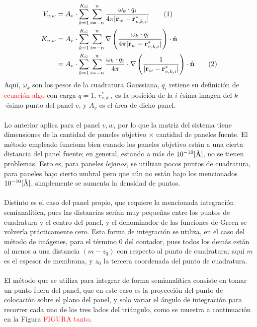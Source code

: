 \documentclass[12pt, oneside, numbers, spanish]{ezthesis}
\newcommand\numberthis{\addtocounter{equation}{1}\tag{\theequation}}
\numberwithin{equation}{section}
\newcommand{\angstrom}{\text{\normalfont\AA}}
\begin{document}
\begin{align*}
V_{v,w} &= A_v\cdot\sum_{k=1}^{K_G}\sum_{i=-n}^{n}\frac{\omega_k\cdot q_i}{4\pi|\mathbf{r}_w - \mathbf{r}_{v,k,i}^*|} \numberthis\\
K_{v,w} &= A_v\cdot\sum_{k=1}^{K_G}\sum_{i=-n}^{n}\nabla\left(\frac{\omega_k\cdot q_i}{4\pi|\mathbf{r}_w - \mathbf{r}_{v,k,i}^*|}\right)\cdot\hat{\mathbf{n}} \\
&= A_v\cdot\sum_{k=1}^{K_G}\sum_{i=-n}^{n}\frac{\omega_k\cdot q_i}{4\pi}\cdot\nabla\left(\frac{1}{|\mathbf{r}_w - \mathbf{r}_{v,k,i}^*|}\right)\cdot\hat{\mathbf{n}}\numberthis
\end{align*}
Aquí, $\omega_k$ son los pesos de la cuadratura Gaussiana, $q_i$ retiene su definición de \textcolor{red}{ecuación algo} con carga $q = 1$, $r_{v,k,i}^*$ es la posición de la $i$-ésima imagen del $k$-ésimo punto del panel $v$, y $A_v$ es el área de dicho panel.\\\\
Lo anterior aplica para el panel $v,w$, por lo que la matriz del sistema tiene dimensiones de la cantidad de paneles objetivo $\times$ cantidad de paneles fuente. El método empleado funciona bien cuando los paneles objetivo están a una cierta distancia del panel fuente; en general, estando a más de $10^{-10} [\angstrom]$, no se tienen problemas. Esto es, para paneles \textit{lejanos}, se utilizan pocos puntos de cuadratura, para paneles bajo cierto umbral pero que aún no están bajo los mencionados $10^{-10} [\angstrom]$, simplemente se aumenta la densidad de puntos.\\\\
Distinto es el caso del panel propio, que requiere la mencionada integración semianalítica, pues las distancias serían muy pequeñas entre los puntos de cuadratura y el centro del panel, y el denominador de las funciones de Green se volvería prácticamente cero. Esta forma de integración se utiliza, en el caso del método de imágenes, para el término 0 del contador, pues todos los demás están al menos a una distancia $(m - z_0)$ con respecto al punto de cuadratura; aquí $m$ es el espesor de membrana, y $z_0$ la tercera coordenada del punto de cuadratura.\\\\
El método que se utiliza para integrar de forma semianalítica consiste en tomar un punto fuera del panel, que en este caso es la proyección del punto de colocación sobre el plano del panel, y solo variar el ángulo de integración para recorrer cada uno de los tres lados del triángulo, como se muestra a continuación en la Figura \textcolor{red}{FIGURA tanto}.
\end{document}
